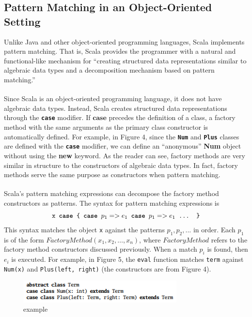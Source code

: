 \documentclass[jou,apacite]{IEEEtran}
\begin{document}
\subsection{Pattern Matching in an Object-Oriented Setting}
Unlike Java and other object-oriented programming languages, Scala implements pattern matching. That is, Scala provides the programmer with a natural and functional-like mechanism for ``creating structured data representations similar to algebraic data types and a decomposition mechanism based on pattern matching.'' \\\\
Since Scala is an object-oriented programming language, it does not have algebraic data types. Instead, Scala creates structured data representations through the \texttt{\textbf{case}} modifier. If $\textbf{case}$ precedes the definition of a class, a factory method with the same arguments as the primary class constructor is automatically defined. For example, in Figure 4, since the \texttt{\textbf{Num}} and \texttt{\textbf{Plus}} classes are defined with the \texttt{\textbf{case}} modifier, we can define an “anonymous” \textbf{Num} object without using the \textbf{new} keyword. As the reader can see, factory methods are very similar in structure to the constructors of algebraic data types. In fact, factory methods serve the same purpose as constructors when pattern matching.\\\\
Scala's pattern matching expressions can decompose the factory method constructors as patterns. The syntax for pattern matching expressions is 
\[
    \texttt{x \textbf{case} \{ \textbf{case} $p_1 => e_1$ \textbf{case} $p_1 => e_1$ ... \}}
\]
This syntax matches the object \texttt{x} against the patterns $p_1, p_2, ...$ in order. Each $p_1$ is of the form $FactoryMethod(x_1, x_2, …, x_n)$, where $FactoryMethod$ refers to the factory method constructors discussed previously. When a match $p_i$ is found, then $e_i$ is executed. For example, in Figure 5, the \texttt{eval} function matches \texttt{term} against \texttt{Num(x)} and \texttt{Plus(left, right)} (the constructors are from Figure 4).

  \begin{figure}[h]
    \centering
    \includegraphics[width=\columnwidth]{abstract_class}
    \caption{example}
    \label{fig:example}
  \end{figure}
\end{document}
